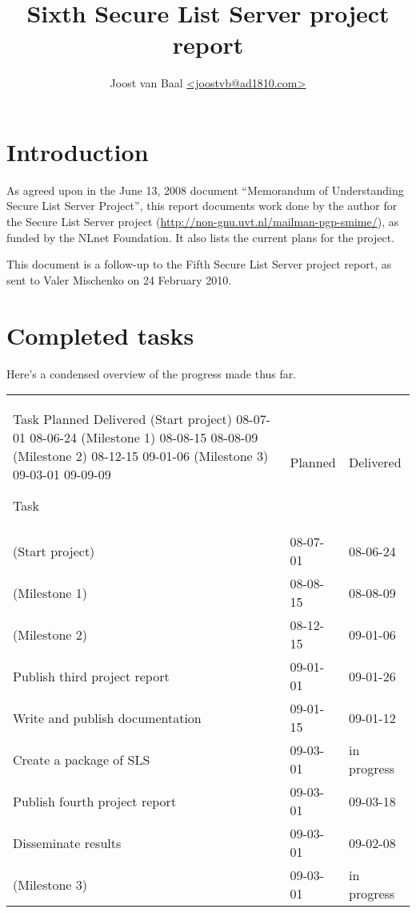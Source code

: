 \documentclass[a4]{article}
\title{Sixth Secure List Server project report}
\author{Joost van Baal \url{<joostvb@ad1810.com>}}
\begin{document}
\maketitle

\setlength{\parindent}{0pt}
\setlength{\parskip}{1.5ex}

\section*{Introduction}

As agreed upon in the June 13, 2008 document ``Memorandum of Understanding
Secure List Server Project'', this report documents work done by the author for
the Secure List Server project
(\url{http://non-gnu.uvt.nl/mailman-pgp-smime/}), as funded by the NLnet
Foundation.  It also lists the current plans for the project.

This document is a follow-up to the Fifth Secure List Server
project report, as sent to Valer Mischenko on 24 February 2010.


\section{Completed tasks}

Here's a condensed overview of the progress made thus far.

\begin{tabular}{lll}


 Task                                Planned   Delivered
 (Start project)                     08-07-01  08-06-24
 (Milestone 1)                       08-08-15  08-08-09
 (Milestone 2)                       08-12-15  09-01-06
 (Milestone 3)                       09-03-01  09-09-09


 Task                            & Planned  & Delivered   \\ \cline{1-3}
 (Start project)                 & 08-07-01 & 08-06-24    \\
 (Milestone 1)                   & 08-08-15 & 08-08-09    \\
 (Milestone 2)                   & 08-12-15 & 09-01-06    \\
 Publish third project report    & 09-01-01 & 09-01-26    \\
 Write and publish documentation & 09-01-15 & 09-01-12    \\
 Create a package of SLS         & 09-03-01 & in progress \\
 Publish fourth project report   & 09-03-01 & 09-03-18    \\
 Disseminate results             & 09-03-01 & 09-02-08    \\
 (Milestone 3)                   & 09-03-01 & in progress \\
\end{tabular}
\end{document}
